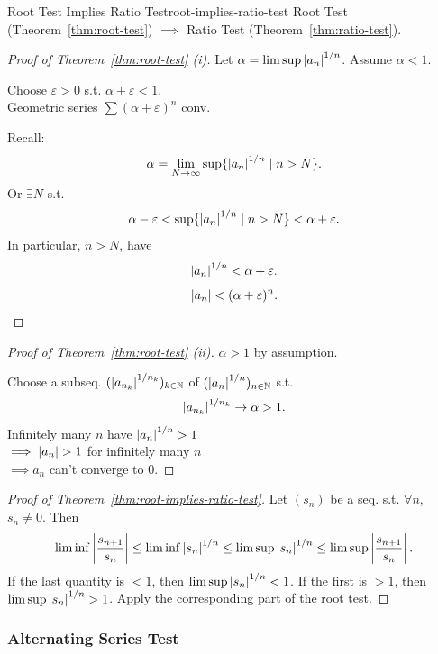 \begin{theorem}{Root Test Implies Ratio Test}{root-implies-ratio-test}
  Root Test (Theorem~\ref{thm:root-test})
  $\implies$ Ratio Test (Theorem~\ref{thm:ratio-test}).
\end{theorem}

\begin{proof}[Proof of Theorem~\ref{thm:root-test} (i)]
  Let $\alpha=\limsup\left\lvert a_n \right\rvert^{1/n}$. Assume $\alpha<1$.

  Choose $\varepsilon>0$ s.t. $\alpha+\varepsilon<1$.\\
  Geometric series $\sum(\alpha+\varepsilon)^n$ conv.

  Recall:
  \[
    \alpha=\lim_{N\to\infty}
    \sup\{\left\lvert a_n \right\rvert^{1/n}\mid n>N\}.
  \]
  Or $\exists N$ s.t.
  \[
    \alpha-\varepsilon
    <\sup\{\left\lvert a_n \right\rvert^{1/n}\mid n>N\}
    <\alpha+\varepsilon.
  \]
  In particular, $n>N$, have
  \[
    \left\lvert a_n \right\rvert^{1/n}<\alpha+\varepsilon.
  \]
  \[
    \left\lvert a_n \right\rvert<(\alpha+\varepsilon)^n.
  \]
\end{proof}

\begin{proof}[Proof of Theorem~\ref{thm:root-test} (ii)]
  $\alpha>1$ by assumption.

  Choose a subseq. $(\left\lvert a_{n_k} \right\rvert^{1/n_k})_{k\in\mathbb{N}}$ of
  $(\left\lvert a_n \right\rvert^{1/n})_{n\in\mathbb{N}}$ s.t.
  \[
    \left\lvert a_{n_k} \right\rvert^{1/n_k}\to\alpha>1.
  \]
  Infinitely many $n$ have $\left\lvert a_n \right\rvert^{1/n}>1$\\
  $\implies\left\lvert a_n \right\rvert>1$ for infinitely many $n$\\
  $\implies a_n$ can't converge to $0$.
\end{proof}

\begin{proof}[Proof of Theorem~\ref{thm:root-implies-ratio-test}]
  Let $(s_n)$ be a seq. s.t. $\forall n$, $s_n\ne0$. Then
  \[
    \liminf\left|\frac{s_{n+1}}{s_n}\right|
    \le\liminf\left\lvert s_n \right\rvert^{1/n}
    \le\limsup\left\lvert s_n \right\rvert^{1/n}
    \le\limsup\left|\frac{s_{n+1}}{s_n}\right|.
  \]
  If the last quantity is $<1$, then $\limsup\left\lvert s_n \right\rvert^{1/n}<1$.
  If the first is $>1$, then $\limsup\left\lvert s_n \right\rvert^{1/n}>1$.
  Apply the corresponding part of the root test.
\end{proof}

\subsubsection{Alternating Series Test}

